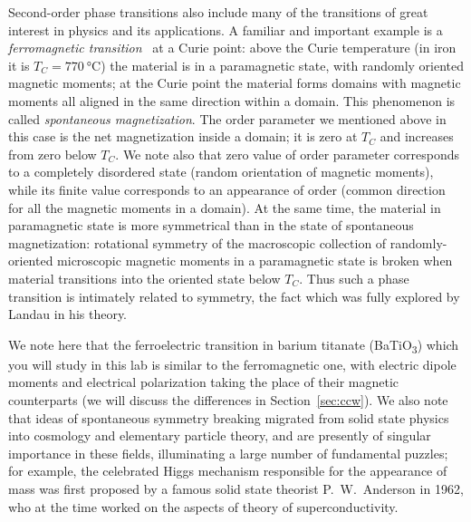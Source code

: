 \documentclass[11pt,a4paper]{article}
\newcommand{\BTO}{BaTiO\textsubscript{3}}
\begin{document}
Second-order phase transitions also include many of the transitions of great
interest in physics and its applications. A familiar and important example is a
\emph{ferromagnetic transition}~\cite{ref:gittrman,ref:papon,ref:blakemore,ref:ashcroft}
at a Curie point: above the Curie temperature (in iron it is
$T_C = \SI{770}{\degreeCelsius}$) the material is in a paramagnetic state, with
randomly oriented magnetic moments; at the Curie point the material forms domains
with magnetic moments all aligned in the same direction within a domain. This
phenomenon is called \emph{spontaneous magnetization}. The order parameter we
mentioned above in this case is the net magnetization inside a domain; it is zero
at $T_C$ and increases from zero below $T_C$. We note also that zero value of
order parameter corresponds to a completely disordered state (random orientation
of magnetic moments), while its finite value corresponds to an appearance of
order (common direction for all the magnetic moments in a domain). At the same
time, the material in paramagnetic state is more symmetrical than in the state of
spontaneous magnetization: rotational symmetry of the macroscopic collection of
randomly-oriented microscopic magnetic moments in a paramagnetic state is broken
when material transitions into the oriented state below $T_C$. Thus such a phase
transition is intimately related to symmetry, the fact which was fully explored
by Landau in his theory.

We note here that the ferroelectric transition in barium titanate (\BTO) which
you will study in this lab is similar to the ferromagnetic one, with electric
dipole moments and electrical polarization taking the place of their magnetic
counterparts (we will discuss the differences in Section~\ref{sec:ccw}). We also
note that ideas of spontaneous symmetry breaking migrated from solid state
physics into cosmology and elementary particle theory, and are presently of
singular importance in these fields, illuminating a large number of fundamental
puzzles; for example, the celebrated Higgs mechanism responsible for the
appearance of mass was first proposed by a famous solid state theorist
P.~W.~Anderson in 1962, who at the time worked on the aspects of theory of
superconductivity.
\end{document}
